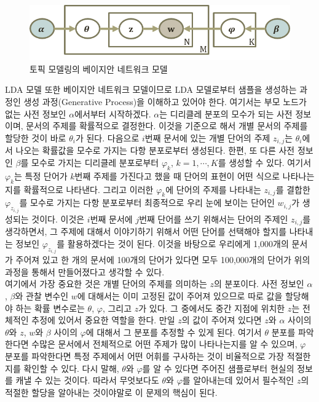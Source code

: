 \documentclass[a4paper]{oblivoir}
\begin{document}
\begin{figure}[ht] \centering 
\includegraphics[scale=0.9]{fig10_21.png} 
\caption{토픽 모델링의 베이지안 네트워크 모델}
\label{fig:10-22}
\end{figure}

LDA 모델 또한 베이지안 네트워크 모델이므로 LDA 모델로부터 샘플을 생성하는 과정인 생성 과정(Generative Process)을 이해하고 있어야 한다. 여기서는 부모 노드가 없는 사전 정보인 $\alpha$에서부터 시작하겠다. $\alpha$는 디리클레 분포의 모수가 되는 사전 정보이며, 문서의 주제를 확률적으로 결정한다. 이것을 기준으로 해서 개별 문서의 주제를 할당한 것이 바로 $\theta_{i}$가 된다. 다음으로 $i$번째 문서에 있는 개별 단어의 주제 $z_{i,j}$는 $\theta_{i}$에서 나오는 확률값을 모수로 가지는 다항 분포로부터 생성된다. 한편, 또 다른 사전 정보인 $\beta$를 모수로 가지는 디리클레 분포로부터 $\varphi_{k}$, $k=1,\cdots,K$를 생성할 수 있다. 여기서 $\varphi_{k}$는 특정 단어가 $k$번째 주제를 가진다고 했을 때 단어의 표현이 어떤 식으로 나타나는지를 확률적으로 나타낸다. 그리고 이러한 $\varphi_{k}$에 단어의 주제를 나타내는 $z_{i,j}$를 결합한 $\varphi_{z_{i,j}}$를 모수로 가지는 다항 분포로부터 최종적으로 우리 눈에 보이는 단어인 $w_{i,j}$가 생성되는 것이다. 이것은 $i$번째 문서에 $j$번째 단어를 쓰기 위해서는 단어의 주제인 $z_{i,j}$를 생각하면서, 그 주제에 대해서 이야기하기 위해서 어떤 단어를 선택해야 할지를 나타내는 정보인 $\varphi_{z_{i,j}}$를 활용하겠다는 것이 된다. 이것을 바탕으로 우리에게 1,000개의 문서가 주어져 있고 한 개의 문서에 100개의 단어가 있다면 모두 100,000개의 단어가 위의 과정을 통해서 만들어졌다고 생각할 수 있다. \\ 

여기에서 가장 중요한 것은 개별 단어의 주제를 의미하는 $z$의 분포이다. 사전 정보인 $\alpha$, $\beta$와 관찰 변수인 $w$에 대해서는 이미 고정된 값이 주어져 있으므로 따로 값을 할당해야 하는 확률 변수로는 $\theta$, $\varphi$, 그리고 $z$가 있다. 그 중에서도 중간 지점에 위치한 $z$는 전체적인 추정에 있어서 중요한 역할을 한다. 만일 $z$의 값이 주어져 있다면 $z$와 $\alpha$ 사이의 $\theta$와 $z$, $w$와 $\beta$ 사이의 $\varphi$에 대해서 그 분포를 추정할 수 있게 된다. 여기서 $\theta$ 분포를 파악한다면 수많은 문서에서 전체적으로 어떤 주제가 많이 나타나는지를 알 수 있으며, $\varphi$ 분포를 파악한다면 특정 주제에서 어떤 어휘를 구사하는 것이 비율적으로 가장 적절한지를 확인할 수 있다. 다시 말해, $\theta$와 $\varphi$를 알 수 있다면 주어진 샘플로부터 현실의 정보를 캐낼 수 있는 것이다. 따라서 무엇보다도 $\theta$와 $\varphi$를 알아내는데 있어서 필수적인 $z$의 적절한 할당을 알아내는 것이야말로 이 문제의 핵심이 된다. \\         
\end{document}
